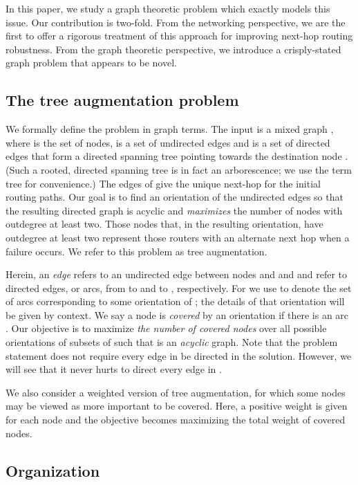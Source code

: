 \documentclass{article}
\begin{document}
In this paper, we study a graph theoretic problem which exactly models
this issue. Our contribution
is two-fold. From the networking perspective, we are the first to
offer a rigorous treatment of this approach for improving next-hop
routing robustness. From the graph theoretic perspective, we introduce a
crisply-stated graph problem that appears to be novel.

\subsection{The {\sc tree augmentation} problem}

We formally define the problem in graph terms.  The input is a mixed
graph , where  is the set of nodes,
 is a set of undirected edges and  is a set of
directed edges that form a directed spanning tree pointing towards the
destination node .  (Such a rooted, directed spanning tree is in
fact an arborescence; we use the term tree for convenience.)  The
edges of  give the unique next-hop for the initial
routing paths.  Our goal is to find an orientation of the undirected
edges  so that the resulting directed graph is acyclic and {\em
  maximizes} the number of nodes with outdegree at least two. Those
nodes that, in the resulting orientation, have outdegree at least two
represent those routers with an alternate next hop when a failure occurs. We
refer to this problem as {\sc tree augmentation}.

Herein, an {\em edge}  refers to an undirected edge between nodes
 and  and  and  refer
to directed edges, or arcs, from  to  and  to , respectively. 
For  we use  to denote the set
of arcs corresponding to some orientation of ; the details of that
orientation will be given by context.  We say a node  is {\em
covered} by an orientation if there is an arc .  Our objective is to maximize {\em the number of
covered nodes} over all possible orientations of subsets  of 
such that  is an {\em
acyclic} graph.  Note that the problem statement does not require
every edge in  be directed in the solution. However, we will see
that it never hurts to direct every edge in .

We also consider a weighted version of {\sc tree augmentation}, for
which some nodes may be viewed as more important to be covered. Here,
a positive weight  is given for each node  and the objective
becomes maximizing the total weight of covered nodes.

\subsection{Organization}
\end{document}
